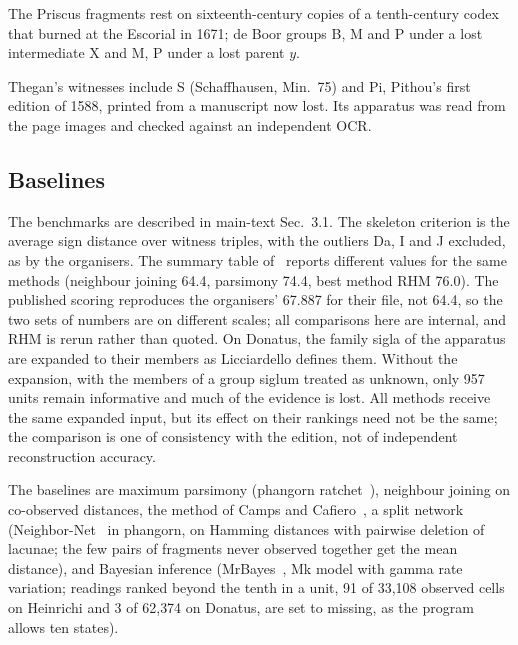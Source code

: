 \documentclass[11pt,a4paper]{article}
\theoremstyle{remark}
\begin{document}
The Priscus fragments rest on sixteenth-century copies of a tenth-century codex that burned at the Escorial in 1671; de Boor groups B, M and P under a lost intermediate X and M, P under a lost parent $y$.

Thegan's witnesses include S (Schaffhausen, Min.~75) and Pi, Pithou's first edition of 1588, printed from a manuscript now lost. Its apparatus was read from the page images and checked against an independent OCR.

\subsection{Baselines}
\label{app:baselines}
The benchmarks are described in main-text Sec.~3.1. The skeleton criterion is the average sign distance over witness triples, with the outliers Da, I and J excluded, as by the organisers. The summary table of~\citet{RoosHeikkila2009} reports different values for the same methods (neighbour joining 64.4, parsimony 74.4, best method RHM 76.0). The published scoring reproduces the organisers' 67.887 for their file, not 64.4, so the two sets of numbers are on different scales; all comparisons here are internal, and RHM is rerun rather than quoted. On Donatus, the family sigla of the apparatus are expanded to their members as Licciardello defines them. Without the expansion, with the members of a group siglum treated as unknown, only 957 units remain informative and much of the evidence is lost. All methods receive the same expanded input, but its effect on their rankings need not be the same; the comparison is one of consistency with the edition, not of independent reconstruction accuracy.

The baselines are maximum parsimony (phangorn ratchet~\citep{Schliep2011}), neighbour joining on co-observed distances, the method of Camps and Cafiero~\citep{CampsCafiero2015}, a split network (Neighbor-Net~\citep{BryantMoulton2004} in phangorn, on Hamming distances with pairwise deletion of lacunae; the few pairs of fragments never observed together get the mean distance), and Bayesian inference (MrBayes~\citep{Ronquist2012}, Mk model with gamma rate variation; readings ranked beyond the tenth in a unit, 91 of 33{,}108 observed cells on Heinrichi and 3 of 62{,}374 on Donatus, are set to missing, as the program allows ten states).
\end{document}
